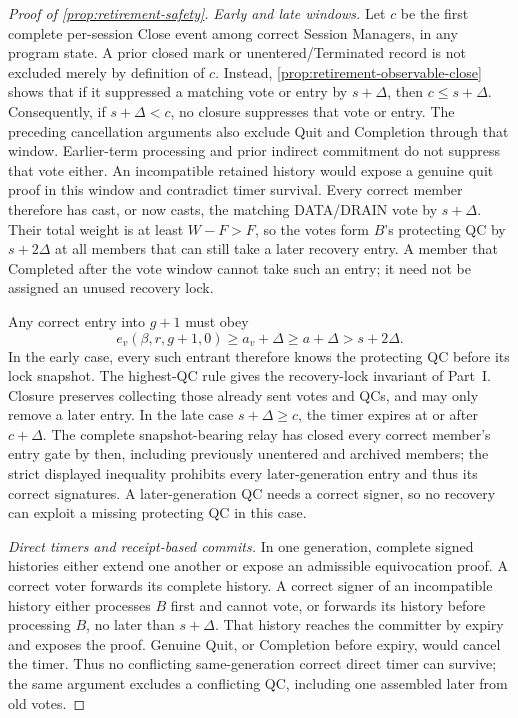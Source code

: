 \documentclass[11pt,a4paper]{article}
\begin{document}
\begin{proof}[Proof of \cref{prop:retirement-safety}]
\emph{Early and late windows.}
Let $c$ be the first complete per-session Close event among
correct Session Managers, in any program state. A prior closed mark or
unentered/Terminated record is not excluded merely by definition of $c$.
Instead, \cref{prop:retirement-observable-close} shows that if it
suppressed a matching vote or entry by $s+\Delta$, then $c\le s+\Delta$.
Consequently, if $s+\Delta<c$, no closure suppresses that vote or entry.
The preceding cancellation arguments also exclude Quit and Completion
through that window. Earlier-term processing and prior indirect
commitment do not suppress that vote either. An incompatible retained
history would expose a genuine quit proof in this window and contradict
timer survival. Every correct member therefore has cast, or now casts,
the matching DATA/DRAIN vote by $s+\Delta$. Their total weight is at least
$W-F>F$, so the votes form $B$'s protecting QC by $s+2\Delta$ at
all members that can still take a later recovery entry. A member that
Completed after the vote window cannot take such an entry; it need
not be assigned an unused recovery lock.

Any correct entry into $g+1$ must obey
\[
 e_v(\beta,r,g+1,0)\ge a_v+\Delta
 \ge a+\Delta>s+2\Delta.
\]
In the early case, every such entrant therefore knows the protecting
QC before its lock snapshot. The highest-QC rule gives the
recovery-lock invariant of Part~I. Closure preserves collecting those already
sent votes and QCs, and may only remove a later entry. In the late
case $s+\Delta\ge c$, the timer expires at or after $c+\Delta$.
The complete snapshot-bearing relay has closed every correct member's
entry gate by then, including previously unentered and archived members; the strict displayed
inequality prohibits every later-generation entry and thus its
correct signatures. A later-generation QC needs a correct signer,
so no recovery can exploit a missing protecting QC in this case.

\emph{Direct timers and receipt-based commits.}
In one generation, complete signed histories either extend one
another or expose an admissible equivocation proof.
A correct voter forwards its complete history. A correct signer of
an incompatible history either processes $B$ first and cannot vote,
or forwards its history before processing $B$, no later than
$s+\Delta$. That history reaches the committer by expiry and exposes
the proof. Genuine Quit, or Completion before expiry, would cancel
the timer. Thus no conflicting same-generation correct direct timer
can survive; the same argument excludes a conflicting QC, including
one assembled later from old votes.


\end{proof}
\end{document}
